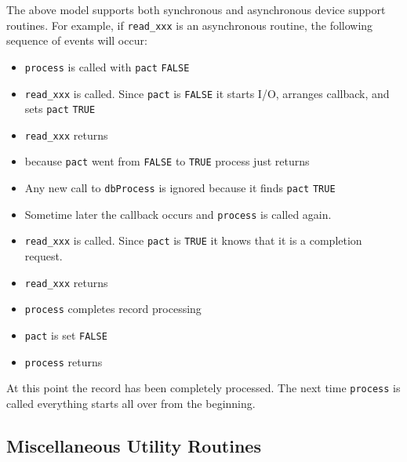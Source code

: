 The above model supports both synchronous and asynchronous device support routines. For example, if \verb|read_xxx| is an 
asynchronous routine, the following sequence of events will occur:

\begin{itemize}\item \verb|process| is called with \verb|pact| \verb|FALSE|

\item \verb|read_xxx| is called. Since \verb|pact| is \verb|FALSE| it starts I/O, arranges callback, and sets \verb|pact| \verb|TRUE|

\item \verb|read_xxx| returns

\item because \verb|pact| went from \verb|FALSE| to \verb|TRUE| process just returns

\item Any new call to \verb|dbProcess| is ignored because it finds \verb|pact| \verb|TRUE|

\item Sometime later the callback occurs and \verb|process| is called again.

\item \verb|read_xxx| is called. Since \verb|pact| is \verb|TRUE| it knows that it is a completion request.

\item \verb|read_xxx| returns

\item \verb|process| completes record processing

\item \verb|pact| is set \verb|FALSE|

\item \verb|process| returns

\end{itemize}At this point the record has been completely processed. The next time \verb|process| is called everything starts all over from 
the beginning.

\subsection{Miscellaneous Utility Routines}


